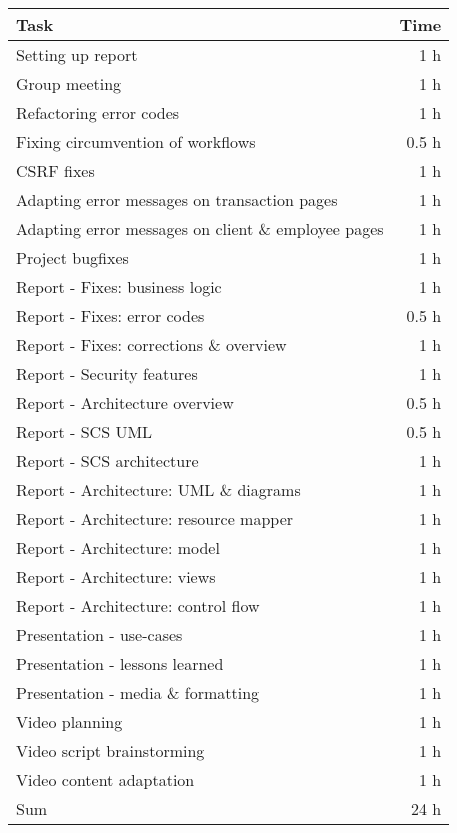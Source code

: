 \begin{table}[h!tpb]
  \centering
  \begin{tabularx}{\textwidth}{X r}
    \toprule
      Task & Time \\
    \midrule
      Setting up report & 1 h \\      
      Group meeting & 1 h \\
      Refactoring error codes & 1 h \\
      Fixing circumvention of workflows & 0.5 h \\
      CSRF fixes & 1 h \\
      Adapting error messages on transaction pages & 1 h \\
      Adapting error messages on client \& employee pages & 1 h \\
      Project bugfixes & 1 h \\
      Report - Fixes: business logic & 1 h \\
      Report - Fixes: error codes & 0.5 h \\
      Report - Fixes: corrections \& overview & 1 h \\
      Report - Security features & 1 h \\
      Report - Architecture overview & 0.5 h \\
      Report - SCS UML & 0.5 h \\
      Report - SCS architecture & 1 h \\
      Report - Architecture: UML \& diagrams & 1 h \\
      Report - Architecture: resource mapper & 1 h \\
      Report - Architecture: model & 1 h \\
      Report - Architecture: views & 1 h \\
      Report - Architecture: control flow & 1 h \\
      Presentation - use-cases & 1 h \\
      Presentation - lessons learned & 1 h \\
      Presentation - media \& formatting & 1 h \\
      Video planning & 1 h \\
      Video script brainstorming & 1 h \\
      Video content adaptation & 1 h \\
    \midrule
      Sum & 24 h \\
    \bottomrule
  \end{tabularx}
\end{table}

